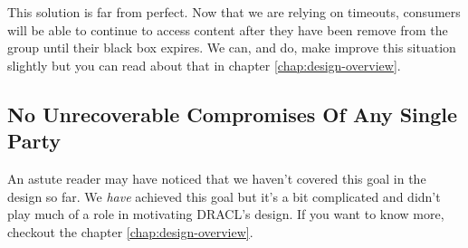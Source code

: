 \documentclass[pdftex,12pt,a4papaer]{report}
\begin{document}
This solution is far from perfect. Now that we are relying on timeouts,
consumers will be able to continue to access content after they have been remove
from the group until their black box expires. We can, and do, make improve this
situation slightly but you can read about that in chapter
\ref{chap:design-overview}.

\subsection{No Unrecoverable Compromises Of Any Single Party}

An astute reader may have noticed that we haven't covered this goal in the
design so far. We \emph{have} achieved this goal but it's a bit complicated and
didn't play much of a role in motivating DRACL's design. If you want to know
more, checkout the chapter \ref{chap:design-overview}.

% 
% 
% 
% 
% 
% 
\end{document}
